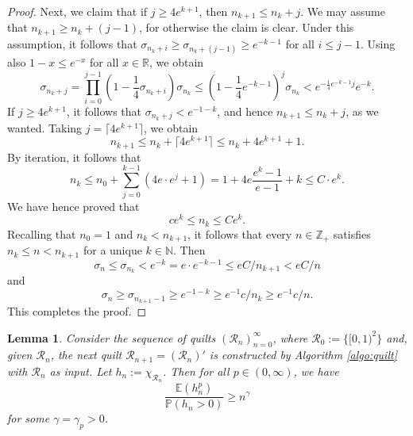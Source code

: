 \documentclass[11pt, reqno]{amsart}
\newtheorem{lemma}[theorem]{Lemma}
\theoremstyle{definition}
\theoremstyle{remark}
\numberwithin{equation}{section}
\newcommand{\E}{\mathbb E}
\newcommand{\N}{\mathbb N}
\renewcommand{\P}{\mathbb P}
\newcommand{\R}{\mathbb R}
\newcommand{\Z}{\mathbb Z}
\newcommand{\ceil}[1]{\lceil #1 \rceil}
\begin{document}
\begin{proof}
Next, we claim that if $j\geq 4e^{k+1}$, then $n_{k+1}\leq n_k+j$. We may assume that $n_{k+1}\geq n_k+(j-1)$, for otherwise the claim is clear. Under this assumption, it follows that $\sigma_{n_k+i}\geq \sigma_{n_k+(j-1)}\geq e^{-k-1}$ for all $i\leq j-1$. Using also $1-x\leq e^{-x}$ for all $x\in\R$, we obtain
\begin{equation*}
   \sigma_{n_k+j}=\prod_{i=0}^{j-1}(1-\frac14\sigma_{n_k+i})\sigma_{n_k}
   \leq (1-\frac14 e^{-k-1})^j\sigma_{n_k}
   < e^{-\frac14 e^{-k-1}j}e^{-k}.
\end{equation*}
If $j\geq 4e^{k+1}$, it follows that $\sigma_{n_k+j}<e^{-1-k}$, and hence $n_{k+1}\leq n_k+j$, as we wanted. Taking $j=\ceil{4e^{k+1}}$, we obtain
\begin{equation*}
  n_{k+1}\leq n_k+\ceil{4e^{k+1}}\leq n_k+4e^{k+1}+1.
\end{equation*}
By iteration, it follows that
\begin{equation*}
  n_k\leq n_0+\sum_{j=0}^{k-1}(4e\cdot e^j+1)
  =1+4e\frac{e^k-1}{e-1}+k\leq C\cdot e^k.
\end{equation*}
We have hence proved that
\begin{equation*}
  ce^k\leq n_k\leq C e^k.
\end{equation*}
Recalling that $n_0=1$ and $n_k<n_{k+1}$, it follows that every $n\in\Z_+$ satisfies $n_k\leq n< n_{k+1}$ for a unique $k\in\N$. Then
\begin{equation*}
  \sigma_n\leq \sigma_{n_k}<e^{-k}=e\cdot e^{-k-1}\leq eC/n_{k+1}<eC/n
\end{equation*}
and
\begin{equation*}
  \sigma_n\geq \sigma_{n_{k+1}-1}\geq e^{-1-k}\geq e^{-1}c/n_k\geq e^{-1}c/n.
\end{equation*}
This completes the proof.
\end{proof}

\begin{lemma}\label{lem:hn-iter}
Consider the sequence of quilts $(\mathscr R_n)_{n=0}^\infty$, where $\mathscr R_0:=\{[0,1)^2\}$ and, given $\mathscr R_n$, the next quilt $\mathscr R_{n+1}=(\mathscr R_n)'$ is constructed by Algorithm \ref{algo:quilt} with $\mathscr R_n$ as input. Let $h_n:=\chi_{\mathscr R_n}$. Then for all $p\in(0,\infty)$, we have
\begin{equation*}
  \frac{\E(h_n^p)}{\P(h_n>0)}\geq n^\gamma
\end{equation*}
for some $\gamma=\gamma_p>0$.
\end{lemma}
\end{document}
